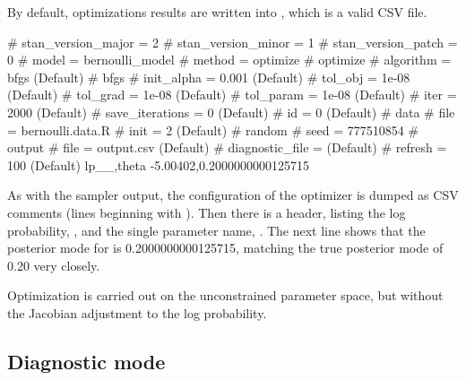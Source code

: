 \documentclass[article]{jss}
\begin{document}
By default, optimizations results are written into ,
which is a valid CSV file.
%
\begin{CodeChunk}
\begin{CodeOutput}
# stan_version_major = 2
# stan_version_minor = 1
# stan_version_patch = 0
# model = bernoulli_model
# method = optimize
#   optimize
#     algorithm = bfgs (Default)
#       bfgs
#         init_alpha = 0.001 (Default)
#         tol_obj = 1e-08 (Default)
#         tol_grad = 1e-08 (Default)
#         tol_param = 1e-08 (Default)
#     iter = 2000 (Default)
#     save_iterations = 0 (Default)
# id = 0 (Default)
# data
#   file = bernoulli.data.R
# init = 2 (Default)
# random
#   seed = 777510854
# output
#   file = output.csv (Default)
#   diagnostic_file =  (Default)
#   refresh = 100 (Default)
lp__,theta
-5.00402,0.2000000000125715
\end{CodeOutput}
\end{CodeChunk}
%
As with the sampler output, the configuration of the optimizer is
dumped as CSV comments (lines beginning with \code{\#}).  Then there
is a header, listing the log probability, , and the
single parameter name, .  The next line shows that the
posterior mode for  is 0.2000000000125715, matching the
true posterior mode of 0.20 very closely.

Optimization is carried out on the unconstrained parameter space, but 
without the Jacobian adjustment to the log probability.

\subsection{Diagnostic mode}
\end{document}
